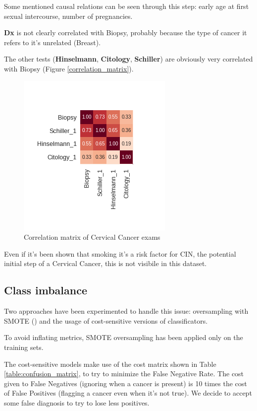 Some mentioned causal relations can be seen through this step: early age at first sexual intercourse, number of pregnancies.

\textbf{Dx} is not clearly correlated with Biopsy, probably because the type of cancer it refers to it's unrelated (Breast).

The other tests (\textbf{Hinselmann}, \textbf{Citology}, \textbf{Schiller}) are obviously very correlated with Biopsy (Figure \ref{correlation_matrix}).

\begin{figure}
    \centerline{
        \includegraphics[width=0.25\paperwidth]{figures/exams_corr.png}}
    \caption{Correlation matrix of Cervical Cancer exams}
    \label{cond_box_plot}
\end{figure}

Even if it's been shown that smoking it's a risk factor for CIN, the potential initial step of a Cervical Cancer, this is not visibile in this dataset.

\subsection{Class imbalance}

Two approaches have been experimented to handle this issue: oversampling with SMOTE (\cite{Chawla2011}) and the usage of cost-sensitive versions of classificators.

To avoid inflating metrics, SMOTE oversampling has been applied only on the training sets.

The cost-sensitive models make use of the cost matrix shown in Table \ref{table:confusion_matrix}, to try to minimize the False Negative Rate. The cost given to False Negatives (ignoring when a cancer is present) is 10 times the cost of False Positives (flagging a cancer even when it's not true). We decide to accept some false diagnosis to try to lose less positives.

